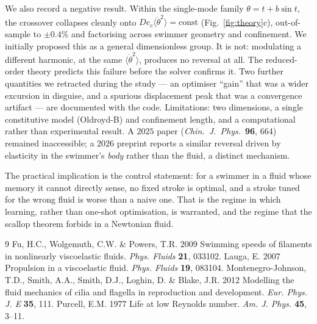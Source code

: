 \documentclass[11pt]{article}
\newcommand{\De}{\mathit{De}}
\newcommand{\Dec}{\De_{c}}
\begin{document}
We also record a negative result. Within the single-mode family
$\theta=t+b\sin t$, the crossover collapses cleanly onto
$\Dec\langle\dot\theta^2\rangle=\mathrm{const}$ (Fig.~\ref{fig:theory}c), out-of-sample to
$\pm0.4\%$ and factorising across swimmer geometry and confinement. We initially proposed this as
a general dimensionless group. It is not: modulating a different harmonic, at the same
$\langle\dot\theta^2\rangle$, produces no reversal at all. The reduced-order theory predicts this
failure before the solver confirms it. Two further quantities we retracted during the study --- an
optimiser ``gain'' that was a wider excursion in disguise, and a spurious displacement peak that
was a convergence artifact --- are documented with the code. Limitations: two dimensions, a single
constitutive model (Oldroyd-B) and confinement length, and a computational rather than
experimental result. A $2025$ paper (\emph{Chin.\ J.\ Phys.}\ \textbf{96}, 664) remained
inaccessible; a $2026$ preprint reports a similar reversal driven by elasticity in the swimmer's
\emph{body} rather than the fluid, a distinct mechanism.

The practical implication is the control statement: for a swimmer in a fluid whose memory it
cannot directly sense, no fixed stroke is optimal, and a stroke tuned for the wrong fluid is worse
than a naive one. That is the regime in which learning, rather than one-shot
optimisation, is warranted, and the regime that the scallop theorem forbids in a Newtonian
fluid.

\begin{thebibliography}{9}
\small
{} Fu, H.C., Wolgemuth, C.W. \& Powers, T.R. 2009 Swimming speeds of
filaments in nonlinearly viscoelastic fluids. \emph{Phys. Fluids} \textbf{21}, 033102.
 Lauga, E. 2007 Propulsion in a viscoelastic fluid.
\emph{Phys. Fluids} \textbf{19}, 083104.
 Montenegro-Johnson, T.D., Smith, A.A.,
Smith, D.J., Loghin, D. \& Blake, J.R. 2012 Modelling the fluid mechanics of cilia and flagella in
reproduction and development. \emph{Eur. Phys. J. E} \textbf{35}, 111.
 Purcell, E.M. 1977 Life at low Reynolds number.
\emph{Am. J. Phys.} \textbf{45}, 3--11.
\end{thebibliography}
\end{document}
